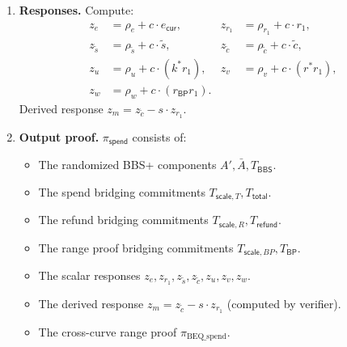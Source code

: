 \documentclass[11pt]{article}
\theoremstyle{definitionstyle}
\theoremstyle{plain}
\begin{document}
\begin{enumerate}[leftmargin=*]
\[\begin{array}{c}
  A' \parallel \bar{A} \parallel T_{\mathsf{BBS}} \parallel T_{\mathsf{scale},T} \parallel T_{\mathsf{total}} \parallel T_{\mathsf{scale},R} \parallel T_{\mathsf{refund}} \parallel T_{\mathsf{scale},BP} \parallel T_{\mathsf{BP}} \parallel \text{``Spend''}
  \end{array}
  \right).
  \]
\item \textbf{Responses.}
  Compute:
  \begin{align*}
    z_e &= \rho_e + c \cdot e_{\mathsf{cur}}, & z_{r_1} &= \rho_{r_1} + c \cdot r_1, \\
    z_{\tilde{s}} &= \rho_{\tilde{s}} + c \cdot \tilde{s}, & z_{\tilde{c}} &= \rho_{\tilde{c}} + c \cdot \tilde{c}, \\
    z_u &= \rho_u + c \cdot (k^* r_1), & z_v &= \rho_v + c \cdot (r^* r_1), \\
    z_w &= \rho_w + c \cdot (r_{\mathsf{BP}} r_1).
  \end{align*}
  Derived response $z_m = z_{\tilde{c}} - s \cdot z_{r_1}$.
\item \textbf{Output proof.}
  $\pi_{\mathsf{spend}}$ consists of:
  \begin{itemize}[leftmargin=*, nosep]
  \item The randomized BBS+ components $A', \bar{A}, T_{\mathsf{BBS}}$.
  \item The spend bridging commitments $T_{\mathsf{scale},T}, T_{\mathsf{total}}$.
  \item The refund bridging commitments $T_{\mathsf{scale},R}, T_{\mathsf{refund}}$.
  \item The range proof bridging commitments $T_{\mathsf{scale},BP}, T_{\mathsf{BP}}$.
  \item The scalar responses $z_e, z_{r_1}, z_{\tilde{s}}, z_{\tilde{c}}, z_u, z_v, z_w$.
  \item The derived response $z_m = z_{\tilde{c}} - s \cdot z_{r_1}$ (computed by verifier).
  \item The cross-curve range proof $\pi_{\text{BEQ\_spend}}$.
  \end{itemize}
\end{enumerate}
\end{document}
